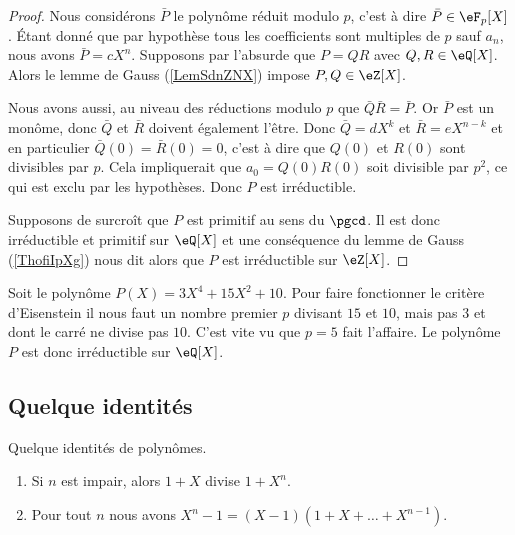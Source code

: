 \begin{proof}
    Nous considérons \( \bar P\) le polynôme réduit modulo \( p\), c'est à dire \( \bar P\in \eF_p[X]\). Étant donné que par hypothèse tous les coefficients sont multiples de \( p\) sauf \( a_n\), nous avons \( \bar P=cX^n\). Supposons par l'absurde que \( P=QR\) avec \( Q,R\in \eQ[X]\). Alors le lemme de Gauss (\ref{LemSdnZNX}) impose \( P,Q\in \eZ[X]\).

    Nous avons aussi, au niveau des réductions modulo \( p\) que $\bar Q\bar R=\bar P$. Or \( \bar P\) est un monôme, donc \( \bar Q\) et \( \bar R\) doivent également l'être. Donc \( \bar Q=dX^k\) et \( \bar R=eX^{n-k}\) et en particulier \( \bar Q(0)=\bar R(0)=0\), c'est à dire que \( Q(0)\) et \( R(0)\) sont divisibles par \( p\). Cela impliquerait que \( a_0=Q(0)R(0)\) soit divisible par \( p^2\), ce qui est exclu par les hypothèses. Donc \( P\) est irréductible.

    Supposons de surcroît que \( P\) est primitif au sens du \( \pgcd\). Il est donc irréductible et primitif sur \( \eQ[X]\) et une conséquence du lemme de Gauss (\ref{ThofiIpXg}) nous dit alors que \( P\) est irréductible sur \( \eZ[X]\).
\end{proof}

\begin{example}
    Soit le polynôme \( P(X)=3X^4+15 X^2+10\). Pour faire fonctionner le critère d'Eisenstein il nous faut un nombre premier \( p\) divisant \( 15\) et \( 10\), mais pas \( 3\) et dont le carré ne divise pas \( 10\). C'est vite vu que \( p=5\) fait l'affaire. Le polynôme \( P\) est donc irréductible sur \( \eQ[X]\).
\end{example}

\subsection{Quelque identités}

\begin{lemma}   \label{LemISPooHIKJBU}
    Quelque identités de polynômes.
    \begin{enumerate}
        \item   \label{ItemLTBooAcyMtN}
            Si \( n\) est impair, alors \( 1+X\) divise \( 1+X^n\).
        \item\label{ItemLTBooAcyMtNii}
            Pour tout \( n\) nous avons \( X^n-1=(X-1)(1+X+\ldots +X^{n-1})\).
    \end{enumerate}
\end{lemma}

